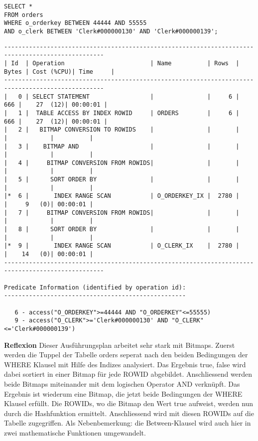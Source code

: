 \documentclass[10pt]{article}
\begin{document}
\begin{lstlisting}[style=sql]
SELECT *
FROM orders
WHERE o_orderkey BETWEEN 44444 AND 55555
AND o_clerk BETWEEN 'Clerk#000000130' AND 'Clerk#000000139';
\end{lstlisting}
\begin{lstlisting}[style=queryexecutionplanSmall]
--------------------------------------------------------------------------------------------------
| Id  | Operation                        | Name          | Rows  | Bytes | Cost (%CPU)| Time     |
--------------------------------------------------------------------------------------------------
|   0 | SELECT STATEMENT                 |               |     6 |   666 |    27  (12)| 00:00:01 |
|   1 |  TABLE ACCESS BY INDEX ROWID     | ORDERS        |     6 |   666 |    27  (12)| 00:00:01 |
|   2 |   BITMAP CONVERSION TO ROWIDS    |               |       |       |            |          |
|   3 |    BITMAP AND                    |               |       |       |            |          |
|   4 |     BITMAP CONVERSION FROM ROWIDS|               |       |       |            |          |
|   5 |      SORT ORDER BY               |               |       |       |            |          |
|*  6 |       INDEX RANGE SCAN           | O_ORDERKEY_IX |  2780 |       |     9   (0)| 00:00:01 |
|   7 |     BITMAP CONVERSION FROM ROWIDS|               |       |       |            |          |
|   8 |      SORT ORDER BY               |               |       |       |            |          |
|*  9 |       INDEX RANGE SCAN           | O_CLERK_IX    |  2780 |       |    14   (0)| 00:00:01 |
--------------------------------------------------------------------------------------------------
 
Predicate Information (identified by operation id):
---------------------------------------------------
 
   6 - access("O_ORDERKEY">=44444 AND "O_ORDERKEY"<=55555)
   9 - access("O_CLERK">='Clerk#000000130' AND "O_CLERK"<='Clerk#000000139')
\end{lstlisting}
\textbf{Reflexion} \newline
Dieser Ausführungsplan arbeitet sehr stark mit Bitmaps. Zuerst werden die Tuppel der Tabelle orders seperat nach den beiden Bedingungen der WHERE Klausel mit Hilfe des Indizes analysiert. Das Ergebnis {true, false} wird dabei sortiert in einer Bitmap für jede ROWID abgebildet.
Anschliessend werden beide Bitmaps miteinander mit dem logischen Operator AND verknüpft. Das Ergebnis ist wiederum eine Bitmap, die jetzt beide Bedingungen der WHERE Klausel erfüllt. Die ROWIDs, wo die Bitmap den Wert {true} aufweist, werden nun durch die Hashfunktion ermittelt. Anschliessend wird mit diesen ROWIDs auf die Tabelle zugegriffen. \newline
Als Nebenbemerkung: die Between-Klausel wird auch hier in zwei mathematische Funktionen umgewandelt.
\end{document}
